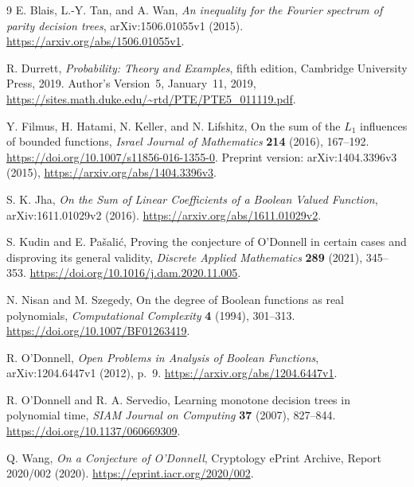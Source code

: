 \begin{thebibliography}{9}
E. Blais, L.-Y. Tan, and A. Wan,
\emph{An inequality for the Fourier spectrum of parity decision trees},
arXiv:1506.01055v1 (2015).
\url{https://arxiv.org/abs/1506.01055v1}.

R. Durrett, \emph{Probability: Theory and Examples}, fifth edition,
Cambridge University Press, 2019.
Author's Version~5, January~11, 2019,
\url{https://sites.math.duke.edu/~rtd/PTE/PTE5_011119.pdf}.

Y. Filmus, H. Hatami, N. Keller, and N. Lifshitz,
On the sum of the $L_1$ influences of bounded functions,
\emph{Israel Journal of Mathematics} \textbf{214} (2016), 167--192.
\url{https://doi.org/10.1007/s11856-016-1355-0}.
Preprint version: arXiv:1404.3396v3 (2015),
\url{https://arxiv.org/abs/1404.3396v3}.

S. K. Jha, \emph{On the Sum of Linear Coefficients of a Boolean Valued
Function}, arXiv:1611.01029v2 (2016).
\url{https://arxiv.org/abs/1611.01029v2}.

S. Kudin and E. Pa\v{s}ali\'c,
Proving the conjecture of O'Donnell in certain cases and disproving
its general validity,
\emph{Discrete Applied Mathematics} \textbf{289} (2021), 345--353.
\url{https://doi.org/10.1016/j.dam.2020.11.005}.

N. Nisan and M. Szegedy,
On the degree of Boolean functions as real polynomials,
\emph{Computational Complexity} \textbf{4} (1994), 301--313.
\url{https://doi.org/10.1007/BF01263419}.

R. O'Donnell, \emph{Open Problems in Analysis of Boolean Functions},
arXiv:1204.6447v1 (2012), p.~9.
\url{https://arxiv.org/abs/1204.6447v1}.

R. O'Donnell and R. A. Servedio,
Learning monotone decision trees in polynomial time,
\emph{SIAM Journal on Computing} \textbf{37} (2007), 827--844.
\url{https://doi.org/10.1137/060669309}.

Q. Wang, \emph{On a Conjecture of O'Donnell},
Cryptology ePrint Archive, Report 2020/002 (2020).
\url{https://eprint.iacr.org/2020/002}.
\end{thebibliography}
